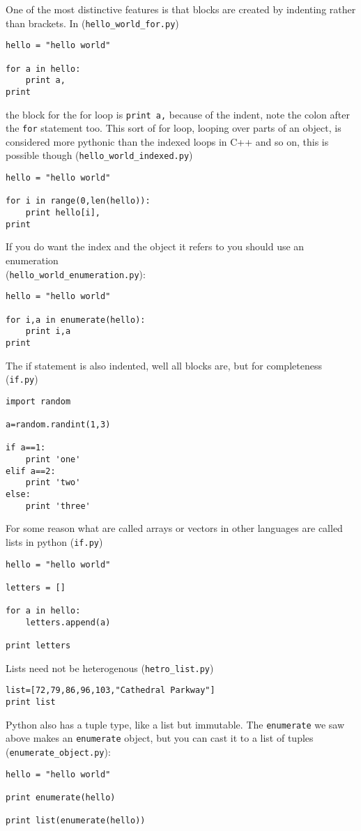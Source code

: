\documentclass[12pt]{article}
\begin{document}
One of the most distinctive features is that blocks are created by
indenting rather than brackets. In  (\texttt{hello\_world\_for.py})
\begin{lstlisting}[numbers=right]
hello = "hello world"

for a in hello:
    print a,
print 
\end{lstlisting}
the block for the for loop is \texttt{print a,} because of the indent,
note the colon after the \texttt{for} statement too. This sort of for
loop, looping over parts of an object, is considered more pythonic
than the indexed loops in C++ and so on, this is possible though  (\texttt{hello\_world\_indexed.py})
\begin{lstlisting}[numbers=right]
hello = "hello world"

for i in range(0,len(hello)):
    print hello[i],
print 
\end{lstlisting}
If you do want the index and the object it refers to you should use an
enumeration\\(\texttt{hello\_world\_enumeration.py}):
\begin{lstlisting}[numbers=right]
hello = "hello world"

for i,a in enumerate(hello):
    print i,a
print 
\end{lstlisting}
The if statement is also indented, well all blocks are, but for completeness  (\texttt{if.py})
\begin{lstlisting}[numbers=right]
import random

a=random.randint(1,3)

if a==1:
    print 'one'
elif a==2:
    print 'two'
else:
    print 'three'
\end{lstlisting}


For some reason what are called arrays or vectors in other languages
are called lists in python  (\texttt{if.py})
\begin{lstlisting}[numbers=right]
hello = "hello world"

letters = []

for a in hello:
    letters.append(a)

print letters
\end{lstlisting}
Lists need not be heterogenous  (\texttt{hetro\_list.py})
\begin{lstlisting}[numbers=right]
list=[72,79,86,96,103,"Cathedral Parkway"]
print list
\end{lstlisting}
Python also has a tuple type, like a list but immutable. The
\texttt{enumerate} we saw above makes an \texttt{enumerate} object,
but you can cast it to a list of tuples (\texttt{enumerate\_object.py}):
\begin{lstlisting}[numbers=right]
hello = "hello world"

print enumerate(hello) 

print list(enumerate(hello)) 
\end{lstlisting}
\end{document}

